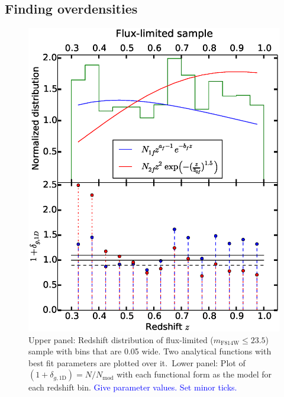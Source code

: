 \documentclass[twocolumn,useAMS,usenatbib]{mn2e}
\newcommand{\rachel}[1]{{\textcolor{red}{#1}}}
\newcommand{\arun}[1]{{\textcolor{blue}{#1}}}
\begin{document}

\subsection{Finding overdensities}
\label{sub:overdensities}
\begin{figure}
 \centering
  \includegraphics[width=\columnwidth]{redshift_fluxlimited}
  \caption{Upper panel: Redshift distribution of flux-limited ($m_\text{F814W}\le 23.5$) sample with bins that are 0.05 wide. Two analytical functions with best fit parameters are plotted over it.\
           Lower panel: Plot of $(1+\delta_{g,\text{1D}}) = N/N_{\text{mod}}$ with each functional form as the model for each redshift bin. \arun{Give parameter values. Set minor ticks.}}
  \label{fig:redshift_fluxlimited}
\end{figure}
\end{document}
